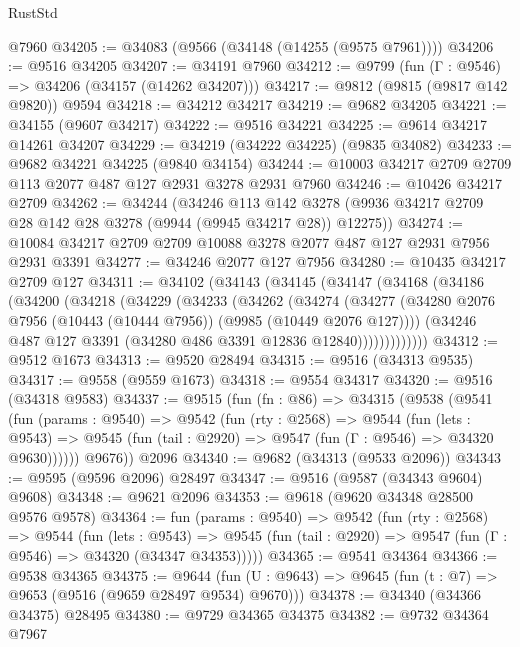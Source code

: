 \begin{lexlean}{RustStd}
\begin{coremodule}
    @7960
@34205 := @34083 (@9566 (@34148 (@14255 (@9575 @7961))))
@34206 := @9516 @34205
@34207 := @34191 @7960
@34212 := @9799 (fun (Γ : @9546) => @34206 (@34157 (@14262 @34207)))
@34217 := @9812 (@9815 (@9817 @142 @9820)) @9594
@34218 := @34212 @34217
@34219 := @9682 @34205
@34221 := @34155 (@9607 @34217)
@34222 := @9516 @34221
@34225 := @9614 @34217 @14261 @34207
@34229 := @34219 (@34222 @34225) (@9835 @34082)
@34233 := @9682 @34221 @34225 (@9840 @34154)
@34244 := @10003 @34217 @2709 @2709 @113 @2077 @487 @127 @2931 @3278 @2931 @7960
@34246 := @10426 @34217 @2709
@34262 := @34244
    (@34246
      @113
      @142
      @3278
      (@9936 @34217 @2709 @28 @142 @28 @3278 (@9944 (@9945 @34217 @28)) @12275))
@34274 := @10084 @34217 @2709 @2709 @10088 @3278 @2077 @487 @127 @2931 @7956 @2931 @3391
@34277 := @34246 @2077 @127 @7956
@34280 := @10435 @34217 @2709 @127
@34311 := @34102
    (@34143
      (@34145
        (@34147
          (@34168
            (@34186
              (@34200
                (@34218
                  (@34229
                    (@34233
                      (@34262
                        (@34274
                          (@34277
                            (@34280
                              @2076
                              @7956
                              (@10443 (@10444 @7956))
                              (@9985 (@10449 @2076 @127))))
                          (@34246 @487 @127 @3391 (@34280 @486 @3391 @12836 @12840)))))))))))))
@34312 := @9512 @1673
@34313 := @9520 @28494
@34315 := @9516 (@34313 @9535)
@34317 := @9558 (@9559 @1673)
@34318 := @9554 @34317
@34320 := @9516 (@34318 @9583)
@34337 := @9515
    (fun (fn : @86) =>
    @34315
      (@9538
        (@9541
          (fun (params : @9540) =>
          @9542
            (fun (rty : @2568) =>
            @9544
              (fun (lets : @9543) =>
              @9545 (fun (tail : @2920) => @9547 (fun (Γ : @9546) => @34320 @9630))))))
        @9676))
    @2096
@34340 := @9682 (@34313 (@9533 @2096))
@34343 := @9595 (@9596 @2096) @28497
@34347 := @9516 (@9587 (@34343 @9604) @9608)
@34348 := @9621 @2096
@34353 := @9618 (@9620 @34348 @28500 @9576 @9578)
@34364 := fun (params : @9540) =>
  @9542
    (fun (rty : @2568) =>
    @9544
      (fun (lets : @9543) =>
      @9545 (fun (tail : @2920) => @9547 (fun (Γ : @9546) => @34320 (@34347 @34353)))))
@34365 := @9541 @34364
@34366 := @9538 @34365
@34375 := @9644
    (fun (U : @9643) => @9645 (fun (t : @7) => @9653 (@9516 (@9659 @28497 @9534) @9670)))
@34378 := @34340 (@34366 @34375) @28495
@34380 := @9729 @34365 @34375
@34382 := @9732 @34364 @7967

\end{coremodule}
\end{lexlean}
